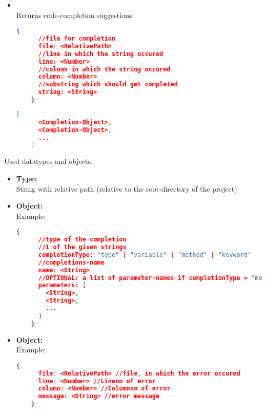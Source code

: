 \begin{itemize}
  \item {} \\
  Returns code-completion suggestions. \\
  \begin{lstlisting}[basicstyle=\small,
    language=json]
    {
      //file for completion
      file: <RelativePath>
      //line in which the string occured
      line: <Number>
      //column in which the string occured
      column: <Number>
      //substring which should get completed
      string: <String>
    }
  \end{lstlisting}
  \begin{lstlisting}[basicstyle=\small,
    language=json]
    [
      <Completion-Object>,
      <Completion-Object>,
      ...
    ]
  \end{lstlisting}
\end{itemize}

Used datatypes and objects.
\begin{itemize}
  \item \textbf{Type:}  \\
  String with relative path (relative to the root-directory of the project)

  \item \textbf{Object:}  \\
  Example:
  \begin{lstlisting}[basicstyle=\small,
    language=json]
    {
      //type of the completion
      //1 of the given strings
      completionType: "type" | "variable" | "method" | "keyword"
      //completions-name
      name: <String>
      //OPTIONAL: a list of parameter-names if completionType = "method"
      parameters: [
        <String>,
        <String>,
        ...
      ]
    }
  \end{lstlisting}

  \item \textbf{Object:}  \\
  Example:
  \begin{lstlisting}[basicstyle=\small,
    language=json]
    {
      file: <RelativePath> //file, in which the error occured
      line: <Number> //Lineno of error
      column: <Number> //Columnno of error
      message: <String> //error message
    }
  \end{lstlisting}
\end{itemize}
